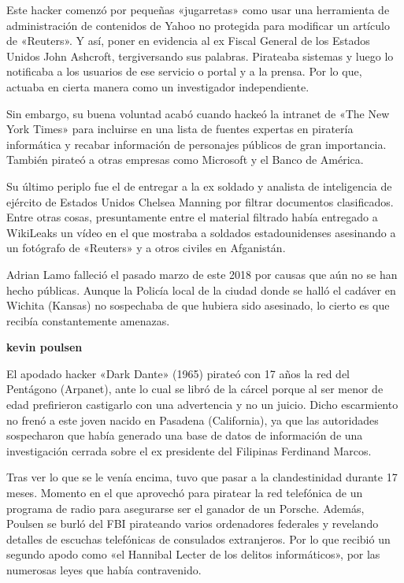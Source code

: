 \documentclass[11pt,a4paper]{article}
\begin{document}
\begin{multicols}{2}
Este hacker comenzó por pequeñas «jugarretas» como usar una herramienta de administración de contenidos de Yahoo no protegida para modificar un artículo de «Reuters». Y así, poner en evidencia al ex Fiscal General de los Estados Unidos John Ashcroft, tergiversando sus palabras. Pirateaba sistemas y luego lo notificaba a los usuarios de ese servicio o portal y a la prensa. Por lo que, actuaba en cierta manera como un investigador independiente.

Sin embargo, su buena voluntad acabó cuando hackeó la intranet de «The New York Times» para incluirse en una lista de fuentes expertas en piratería informática y recabar información de personajes públicos de gran importancia. También pirateó a otras empresas como Microsoft y el Banco de América.

Su último periplo fue el de entregar a la ex soldado y analista de inteligencia de ejército de Estados Unidos Chelsea Manning por filtrar documentos clasificados. Entre otras cosas, presuntamente entre el material filtrado había entregado a WikiLeaks un vídeo en el que mostraba a soldados estadounidenses asesinando a un fotógrafo de «Reuters» y a otros civiles en Afganistán.

Adrian Lamo falleció el pasado marzo de este 2018 por causas que aún no se han hecho públicas. Aunque la Policía local de la ciudad donde se halló el cadáver en Wichita (Kansas) no sospechaba de que hubiera sido asesinado, lo cierto es que recibía constantemente amenazas.

\begin{center}
\textbf{kevin poulsen}
\end{center}
El apodado hacker «Dark Dante» (1965) pirateó con 17 años la red del Pentágono (Arpanet), ante lo cual se libró de la cárcel porque al ser menor de edad prefirieron castigarlo con una advertencia y no un juicio. Dicho escarmiento no frenó a este joven nacido en Pasadena (California), ya que las autoridades sospecharon que había generado una base de datos de información de una investigación cerrada sobre el ex presidente del Filipinas Ferdinand Marcos.

Tras ver lo que se le venía encima, tuvo que pasar a la clandestinidad durante 17 meses. Momento en el que aprovechó para piratear la red telefónica de un programa de radio para asegurarse ser el ganador de un Porsche. Además, Poulsen se burló del FBI pirateando varios ordenadores federales y revelando detalles de escuchas telefónicas de consulados extranjeros. Por lo que recibió un segundo apodo como «el Hannibal Lecter de los delitos informáticos», por las numerosas leyes que había contravenido.


\end{multicols}
\end{document}
